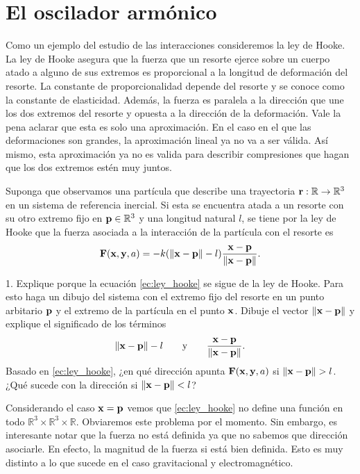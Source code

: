 \documentclass{article}
\begin{document}
\section{El oscilador armónico}

Como un ejemplo del estudio de las interacciones consideremos la ley de Hooke. La ley de Hooke asegura que la fuerza que un resorte ejerce sobre un cuerpo atado a alguno de sus extremos es proporcional a la longitud de deformación del resorte. La constante de proporcionalidad depende del resorte y se conoce como la constante de elasticidad. Además, la fuerza es paralela a la dirección que une los dos extremos del resorte y opuesta a la dirección de la deformación. Vale la pena aclarar que esta es solo una aproximación. En el caso en el que las deformaciones son grandes, la aproximación lineal ya no va a ser válida. Así mismo, esta aproximación ya no es valida para describir compresiones que hagan que los dos extremos estén muy juntos.

Suponga que observamos una partícula que describe una trayectoria $\vb{r}:\mathbb{R}\rightarrow\mathbb{R}^3$ en un sistema de referencia inercial. Si esta se encuentra atada a un resorte con su otro extremo fijo en $\vb{p}\in\mathbb{R}^3$ y una longitud natural $l$, se tiene por la ley de Hooke que la fuerza asociada a la interacción de la partícula con el resorte es
\begin{equation}\label{ec:ley_hooke}
\vb{F}(\vb{x},\vb{y},a)=-k(\|\vb{x}-\vb{p}\|-l)\frac{\vb{x}-\vb{p}}{\|\vb{x}-\vb{p}\|}.
\end{equation}

1. Explique porque la ecuación \eqref{ec:ley_hooke} se sigue de la ley de Hooke. Para esto haga un dibujo del sistema con el extremo fijo del resorte en un punto arbitario $\vb{p}$ y el extremo de la partícula en el punto $\vb{x}$. Dibuje el vector $\|\vb{x}-\vb{p}\|$ y explique el significado de los términos 
\begin{equation}
\|\vb{x}-\vb{p}\|-l\qquad\text{y}\qquad\frac{\vb{x}-\vb{p}}{\|\vb{x}-\vb{p}\|}.
\end{equation} 
Basado en \eqref{ec:ley_hooke}, ¿en qué dirección apunta $\vb{F}(\vb{x},\vb{y},a)$ si $\|\vb{x}-\vb{p}\|>l$. ¿Qué sucede con la dirección si $\|\vb{x}-\vb{p}\|<l$? 

Considerando el caso $\vb{x}=\vb{p}$ vemos que \eqref{ec:ley_hooke} no define una función en todo $\mathbb{R}^3\times\mathbb{R}^3\times\mathbb{R}$. Obviaremos este problema por el momento. Sin embargo, es interesante notar que la fuerza no está definida ya que no sabemos que dirección asociarle. En efecto, la magnitud de la fuerza si está bien definida. Esto es muy distinto a lo que sucede en el caso gravitacional y electromagnético.
\end{document}
